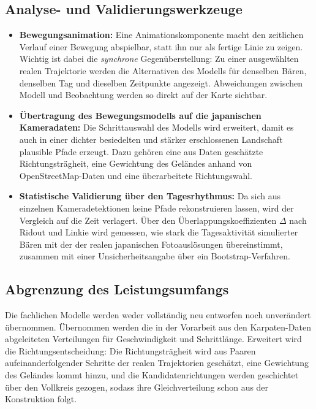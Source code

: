 \documentclass[12pt,a4paper]{report}
\begin{document}
\subsection*{Analyse- und Validierungswerkzeuge}

\begin{itemize}
    \item \textbf{Bewegungsanimation:} Eine Animationskomponente macht den zeitlichen
    Verlauf einer Bewegung abspielbar, statt ihn nur als fertige Linie zu zeigen. Wichtig
    ist dabei die \emph{synchrone} Gegenüberstellung: Zu einer ausgewählten realen
    Trajektorie werden die Alternativen des Modells für denselben Bären, denselben Tag und
    dieselben Zeitpunkte angezeigt. Abweichungen zwischen Modell und Beobachtung werden so
    direkt auf der Karte sichtbar.

    \item \textbf{Übertragung des Bewegungsmodells auf die japanischen Kameradaten:} Die
    Schrittauswahl des Modells wird erweitert, damit es auch in einer dichter besiedelten
    und stärker erschlossenen Landschaft plausible Pfade erzeugt. Dazu gehören eine aus
    Daten geschätzte Richtungsträgheit, eine Gewichtung des Geländes anhand von
    OpenStreetMap-Daten und eine überarbeitete Richtungswahl.

    \item \textbf{Statistische Validierung über den Tagesrhythmus:} Da sich aus einzelnen
    Kameradetektionen keine Pfade rekonstruieren lassen, wird der Vergleich auf die Zeit
    verlagert. Über den Überlappungskoeffizienten $\Delta$ nach Ridout und Linkie
    \cite{RidoutLinkie2009} wird gemessen, wie stark die Tagesaktivität simulierter Bären
    mit der der realen japanischen Fotoauslösungen übereinstimmt, zusammen mit einer
    Unsicherheitsangabe über ein Bootstrap-Verfahren.
\end{itemize}

\subsection*{Abgrenzung des Leistungsumfangs}

Die fachlichen Modelle werden weder vollständig neu entworfen noch unverändert übernommen.
Übernommen werden die in der Vorarbeit \cite{BreuBA} aus den Karpaten-Daten abgeleiteten
Verteilungen für Geschwindigkeit und Schrittlänge. Erweitert wird die
Richtungsentscheidung: Die Richtungsträgheit wird aus Paaren aufeinanderfolgender Schritte
der realen Trajektorien geschätzt, eine Gewichtung des Geländes kommt hinzu, und die
Kandidatenrichtungen werden geschichtet über den Vollkreis gezogen, sodass ihre
Gleichverteilung schon aus der Konstruktion folgt.
\end{document}
